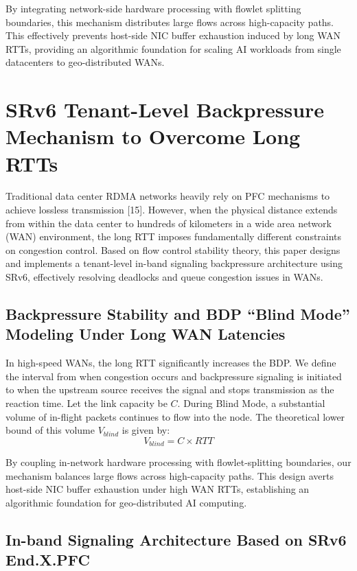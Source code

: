 \documentclass[a4paper]{jpconf}
\begin{document}
By integrating network-side hardware processing with flowlet splitting boundaries, this mechanism distributes large flows across high-capacity paths. This effectively prevents host-side NIC buffer exhaustion induced by long WAN RTTs, providing an algorithmic foundation for scaling AI workloads from single datacenters to geo-distributed WANs.


\section{SRv6 Tenant-Level Backpressure Mechanism to Overcome Long RTTs}


Traditional data center RDMA networks heavily rely on PFC mechanisms to achieve lossless transmission [15]. However, when the physical distance extends from within the data center to hundreds of kilometers in a wide area network (WAN) environment, the long RTT imposes fundamentally different constraints on congestion control. Based on flow control stability theory, this paper designs and implements a tenant-level in-band signaling backpressure architecture using SRv6, effectively resolving deadlocks and queue congestion issues in WANs.


\subsection{Backpressure Stability and BDP ``Blind Mode'' Modeling Under Long WAN Latencies}


In high-speed WANs, the long RTT significantly increases the BDP. We define the interval from when congestion occurs and backpressure signaling is initiated to when the upstream source receives the signal and stops transmission as the reaction time. Let the link capacity be $C$. During Blind Mode, a substantial volume of in-flight packets continues to flow into the node. The theoretical lower bound of this volume $V_{blind}$ is given by:
\begin{equation}
V_{blind} = C \times RTT
\end{equation}


By coupling in-network hardware processing with flowlet-splitting boundaries, our mechanism balances large flows across high-capacity paths. This design averts host-side NIC buffer exhaustion under high WAN RTTs, establishing an algorithmic foundation for geo-distributed AI computing.


\subsection{In-band Signaling Architecture Based on SRv6 End.X.PFC}
\end{document}

